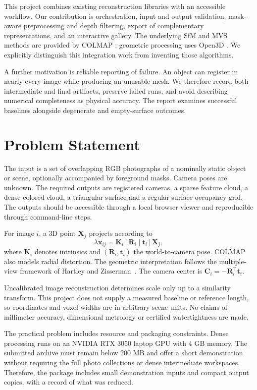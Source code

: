 \documentclass[conference]{IEEEtran}
\begin{document}
This project combines existing reconstruction libraries with an accessible workflow. Our contribution is orchestration, input and output validation, mask-aware preprocessing and depth filtering, export of complementary representations, and an interactive gallery. The underlying SfM and MVS methods are provided by COLMAP \cite{sfm,mvs}; geometric processing uses Open3D \cite{open3d}. We explicitly distinguish this integration work from inventing those algorithms.

A further motivation is reliable reporting of failure. An object can register in nearly every image while producing an unusable mesh. We therefore record both intermediate and final artifacts, preserve failed runs, and avoid describing numerical completeness as physical accuracy. The report examines successful baselines alongside degenerate and empty-surface outcomes.

\section{Problem Statement}
The input is a set of overlapping RGB photographs of a nominally static object or scene, optionally accompanied by foreground masks. Camera poses are unknown. The required outputs are registered cameras, a sparse feature cloud, a dense colored cloud, a triangular surface and a regular surface-occupancy grid. The outputs should be accessible through a local browser viewer and reproducible through command-line steps.

For image $i$, a 3D point $\mathbf{X}_j$ projects according to
\begin{equation}
\lambda\mathbf{x}_{ij}=\mathbf{K}_i[\mathbf{R}_i\mid\mathbf{t}_i]\mathbf{X}_j,
\end{equation}
where $\mathbf{K}_i$ denotes intrinsics and $(\mathbf{R}_i,\mathbf{t}_i)$ the world-to-camera pose. COLMAP also models radial distortion. The geometric interpretation follows the multiple-view framework of Hartley and Zisserman~\cite{hartley}. The camera center is $\mathbf{C}_i=-\mathbf{R}_i^\top\mathbf{t}_i$.

Uncalibrated image reconstruction determines scale only up to a similarity transform. This project does not supply a measured baseline or reference length, so coordinates and voxel widths are in arbitrary scene units. No claims of millimeter accuracy, dimensional metrology or certified watertightness are made.

The practical problem includes resource and packaging constraints. Dense processing runs on an NVIDIA RTX 3050 laptop GPU with 4 GB memory. The submitted archive must remain below 200 MB and offer a short demonstration without requiring the full photo collections or dense intermediate workspaces. Therefore, the package includes small demonstration inputs and compact output copies, with a record of what was reduced.
\end{document}
